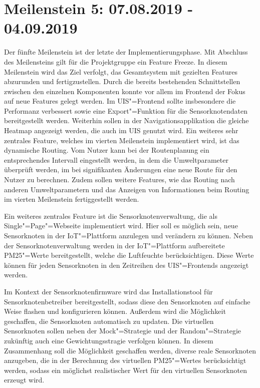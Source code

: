 \section{Meilenstein 5: 07.08.2019 - 04.09.2019}
Der fünfte Meilenstein ist der letzte der Implementierungsphase.
Mit Abschluss des Meilensteins gilt für die Projektgruppe ein Feature Freeze.
In diesem Meilenstein wird das Ziel verfolgt, das Gesamtsystem mit gezielten Features abzurunden und fertigzustellen.
Durch die bereits bestehenden Schnittstellen zwischen den einzelnen Komponenten konnte vor allem im Frontend der Fokus auf neue Features gelegt werden.
Im UIS"=Frontend sollte insbesondere die Performanz verbessert sowie eine Export"=Funktion für die Sensorknotendaten bereitgestellt werden.
Weiterhin sollen in der Navigationsapplikation die gleiche Heatmap angezeigt werden, die auch im UIS genutzt wird.
Ein weiteres sehr zentrales Feature, welches im vierten Meilenstein implementiert wird, ist das dynamische Routing.
Vom Nutzer kann bei der Routenplanung ein entsprechendes Intervall eingestellt werden, in dem die Umweltparameter überprüft werden, im bei signifikanten Änderungen eine neue Route für den Nutzer zu berechnen.
Zudem sollen weitere Features, wie das Routing nach anderen Umweltparametern und das Anzeigen von Informationen beim Routing im vierten Meilenstein fertiggestellt werden.


Ein weiteres zentrales Feature ist die Sensorknotenverwaltung, die als Single"=Page"=Webseite implementiert wird.
Hier soll es möglich sein, neue Sensorknoten in der IoT"=Plattform anzulegen und verändern zu können.
Neben der Sensorknotenverwaltung werden in der IoT"=Plattform aufbereitete PM25"=Werte bereitgestellt, welche die Luftfeuchte berücksichtigen.
Diese Werte können für jeden Sensorknoten in den Zeitreihen des UIS"=Frontends angezeigt werden.


Im Kontext der Sensorknotenfirmware wird das Installationstool für Sensorknotenbetreiber bereitgestellt, sodass diese den Sensorknoten auf einfache Weise flashen und konfigurieren können.
Außerdem wird die Möglichkeit geschaffen, die Sensorknoten automatisch zu updaten.
Die virtuellen Sensorknoten sollen neben der Mock"=Strategie und der Random"=Strategie zukünftig auch eine Gewichtungsstragie verfolgen können.
In diesem Zusammenhang soll die Möglichkeit geschaffen werden, diverse reale Sensorknoten anzugeben, die in der Berechnung des virtuellen PM25"=Wertes berücksichtigt werden, sodass ein möglichst realistischer Wert für den virtuellen Sensorknoten erzeugt wird.


